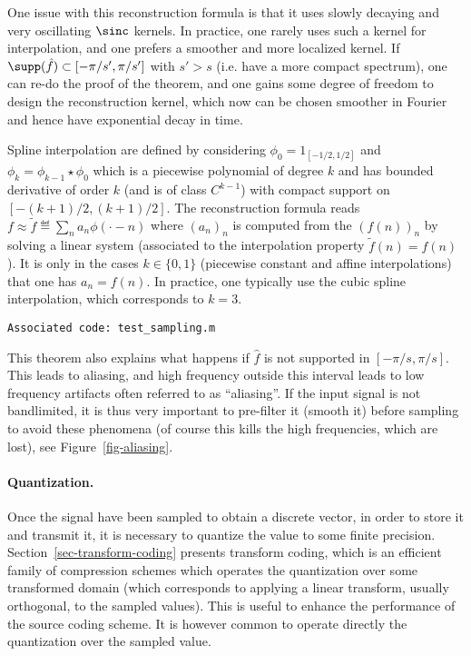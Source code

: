 One issue with this reconstruction formula is that it uses slowly decaying and very oscillating $\sinc$ kernels. In practice, one rarely uses such a kernel for interpolation, and one prefers a smoother and more localized kernel. If $\supp(\hat f) \subset [-\pi/s',\pi/s']$ with $s'>s$ (i.e. have a more compact spectrum), one can re-do the proof of the theorem, and one gains some degree of freedom to design the reconstruction kernel, which now can be chosen smoother in Fourier and hence have exponential decay in time. 

%
Spline interpolation are defined by considering $\phi_0=1_{[-1/2,1/2]}$ and $\phi_k = \phi_{k-1} \star \phi_0$ which is a piecewise polynomial of degree $k$ and has bounded derivative of order $k$ (and is of class $C^{k-1}$) with compact support on $[-(k+1)/2,(k+1)/2]$. The reconstruction formula reads $f \approx \tilde f \eqdef \sum_n a_n \phi(\cdot-n)$ where $(a_n)_n$ is computed from the $(f(n))_n$ by solving a linear system (associated to the interpolation property $\tilde f(n)=f(n)$). It is only in the cases $k \in \{0,1\}$ (piecewise constant and affine interpolations) that one has $a_n=f(n)$.
%
In practice, one typically use the cubic spline interpolation, which corresponds to $k=3$.

\texttt{Associated code: test\_sampling.m}




This theorem also explains what happens if $\hat f$ is not supported in $[-\pi/s,\pi/s]$. This leads to aliasing, and high frequency outside this interval leads to low frequency artifacts often referred to as ``aliasing''. If the input signal is not bandlimited, it is thus very important to pre-filter it (smooth it) before sampling to avoid these phenomena (of course this kills the high frequencies, which are lost), see Figure~\ref{fig-aliasing}. 


\paragraph{Quantization.}

Once the signal have been sampled to obtain a discrete vector, in order to store it and transmit it, it is necessary to quantize the value to some finite precision. 
% 
Section~\ref{sec-transform-coding} presents transform coding, which is an efficient family of compression schemes which operates the quantization over some transformed domain (which corresponds to applying a linear transform, usually orthogonal, to the sampled values). This is useful to enhance the performance of the source coding scheme. It is however common to operate directly the quantization over the sampled value. 

